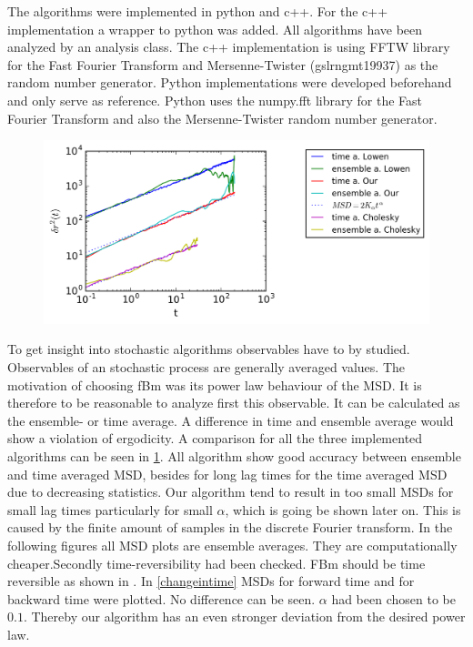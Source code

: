 \documentclass[
  a4paper,BCOR10mm,oneside,
  bibtotoc,idxtotoc,
  headsepline,footsepline,%
  fleqn,openbib
]{scrbook}
\begin{document}
The algorithms were implemented in python and c++. For the c++ implementation a wrapper to python was added. All algorithms have been analyzed by an analysis class. The c++ implementation is using FFTW library for the Fast Fourier Transform and Mersenne-Twister (gsl\texttt{\textunderscore}rng\texttt{\textunderscore}mt19937) as the random number generator. Python implementations were developed beforehand and only serve as reference. Python uses the numpy.fft library for the Fast Fourier Transform and also the Mersenne-Twister random number generator.\newline \begin{figure}[h!]
  \centering
  \includegraphics[width=\textwidth]{./data/timevsensambe.png}
  \captionsetup{width=\linewidth}
  \label{fig:4}
\end{figure}
To get insight into stochastic algorithms observables have to by studied. Observables of an stochastic process are generally averaged values. The motivation of choosing fBm was its power law behaviour of the MSD. It is therefore to be reasonable to analyze first this observable. It can be calculated as the ensemble- or time average. A difference in time and ensemble average would show a violation of ergodicity. A comparison for all the three implemented algorithms can be seen in \cref{fig:4}. All algorithm show good accuracy between ensemble and time averaged MSD, besides for long lag times for the time averaged MSD due to decreasing statistics. Our algorithm tend to result in too  small MSDs for small lag times particularly for small $\alpha$, which is going be shown later on. This is caused by the finite amount of samples in the discrete Fourier transform. In the following figures all MSD plots are ensemble averages. They are computationally cheaper.\newline Secondly time-reversibility had been checked. FBm should be time reversible as shown in \cite{Horvai2007}. In \cref{changeintime} MSDs for forward time and for backward time were plotted. No difference can be seen. $\alpha$ had been chosen to be $0.1$. Thereby our algorithm has an even stronger deviation from the desired power law.
\end{document}
